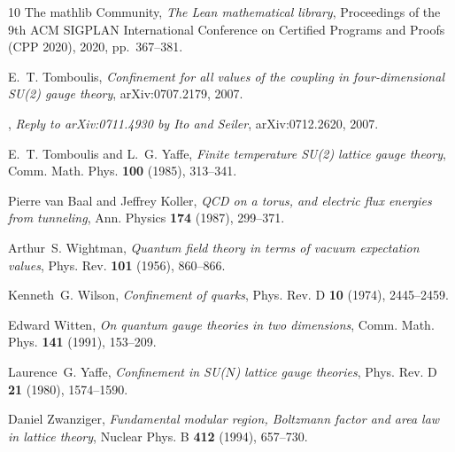 \documentclass[11pt,a4paper]{amsart}
\theoremstyle{definition}
\theoremstyle{remark}
\numberwithin{equation}{section}
\begin{document}
\begin{thebibliography}{10}
{The mathlib Community}, \emph{The {L}ean mathematical library}, Proceedings of
  the 9th {ACM} {SIGPLAN} International Conference on Certified Programs and
  Proofs ({CPP} 2020), 2020, pp.~367--381.

E.~T. Tomboulis, \emph{Confinement for all values of the coupling in
  four-dimensional {SU}(2) gauge theory}, arXiv:0707.2179, 2007.

\bysame, \emph{Reply to {arXiv:0711.4930} by {I}to and {S}eiler},
  arXiv:0712.2620, 2007.

E.~T. Tomboulis and L.~G. Yaffe, \emph{Finite temperature {SU}(2) lattice gauge
  theory}, Comm. Math. Phys. \textbf{100} (1985), 313--341.

Pierre van Baal and Jeffrey Koller, \emph{{QCD} on a torus, and electric flux
  energies from tunneling}, Ann. Physics \textbf{174} (1987), 299--371.

Arthur~S. Wightman, \emph{Quantum field theory in terms of vacuum expectation
  values}, Phys. Rev. \textbf{101} (1956), 860--866.

Kenneth~G. Wilson, \emph{Confinement of quarks}, Phys. Rev. D \textbf{10}
  (1974), 2445--2459.

Edward Witten, \emph{On quantum gauge theories in two dimensions}, Comm. Math.
  Phys. \textbf{141} (1991), 153--209.

Laurence~G. Yaffe, \emph{Confinement in {SU}({$N$}) lattice gauge theories},
  Phys. Rev. D \textbf{21} (1980), 1574--1590.

Daniel Zwanziger, \emph{Fundamental modular region, {B}oltzmann factor and area
  law in lattice theory}, Nuclear Phys. B \textbf{412} (1994), 657--730.

\end{thebibliography}
\end{document}
